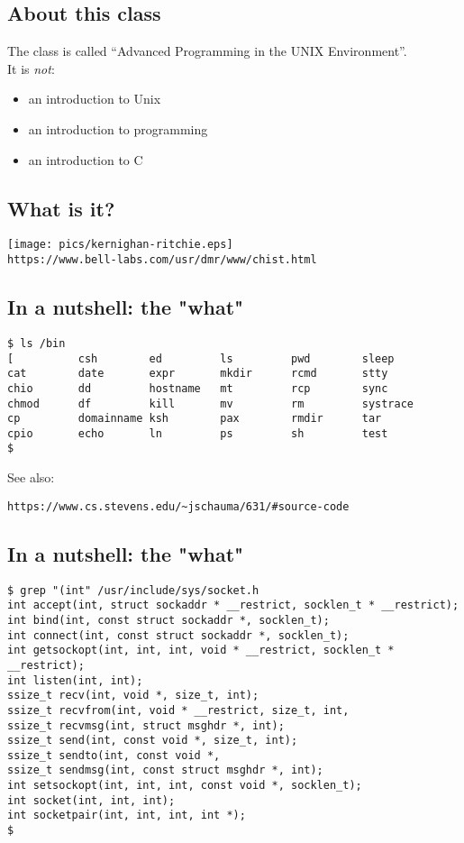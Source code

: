 \documentclass[sxga]{xdvislides}
\begin{document}
\subsection{About this class}
The class is called ``Advanced Programming in the UNIX
Environment''.\\

It is {\em not}:
\begin{itemize}
	\item an introduction to Unix
	\item an introduction to programming
	\item an introduction to C
\end{itemize}


\subsection{What is it?}
\begin{center}
\texttt{[image: pics/kernighan-ritchie.eps]} \\
\verb+https://www.bell-labs.com/usr/dmr/www/chist.html+
\end{center}

\subsection{In a nutshell: the "what"}
\begin{verbatim}
$ ls /bin
[          csh        ed         ls         pwd        sleep
cat        date       expr       mkdir      rcmd       stty
chio       dd         hostname   mt         rcp        sync
chmod      df         kill       mv         rm         systrace
cp         domainname ksh        pax        rmdir      tar
cpio       echo       ln         ps         sh         test
$
\end{verbatim}


See also:
\begin{verbatim}
https://www.cs.stevens.edu/~jschauma/631/#source-code
\end{verbatim}

\subsection{In a nutshell: the "what"}
\begin{verbatim}
$ grep "(int" /usr/include/sys/socket.h
int	accept(int, struct sockaddr * __restrict, socklen_t * __restrict);
int	bind(int, const struct sockaddr *, socklen_t);
int	connect(int, const struct sockaddr *, socklen_t);
int	getsockopt(int, int, int, void * __restrict, socklen_t * __restrict);
int	listen(int, int);
ssize_t	recv(int, void *, size_t, int);
ssize_t	recvfrom(int, void * __restrict, size_t, int,
ssize_t	recvmsg(int, struct msghdr *, int);
ssize_t	send(int, const void *, size_t, int);
ssize_t	sendto(int, const void *,
ssize_t	sendmsg(int, const struct msghdr *, int);
int	setsockopt(int, int, int, const void *, socklen_t);
int	socket(int, int, int);
int	socketpair(int, int, int, int *);
$
\end{verbatim}
\end{document}
